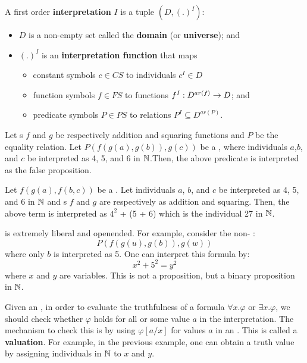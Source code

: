 \documentclass[english, 11pt]{article}
\begin{document}
  \begin{defn}[interpretation]\label{interpretation}
  A first order \textbf{interpretation} $I$ is a tuple $(D,(.)^I)$:
  \begin{itemize}
    \item $D$ is a non-empty set called the \textbf{domain} (or \textbf{universe}); and
    \item $(.)^I$ is an \textbf{interpretation function} that maps
    \begin{itemize}
      \item constant symbols $c \in CS$ to individuals $c^I \in D$
      \item function symbols $f \in FS$ to functions $f^I:D^{ar(f)} \rightarrow D$; and
      \item predicate symbols $P \in PS$ to relations $P^I \subseteq D^{ar(P)}$.
    \end{itemize}
  \end{itemize}
  \end{defn}
  \begin{exmp}
    Let s $f$ and $g$ be respectively addition and squaring functions and $P$ be the equality relation. Let $P(f(g(a),g(b)),g(c))$ be a  , where individuals $a$,$b$, and $c$ be interpreted as 4, 5, and 6 in ${\mathbb{N}}$.Then, the above predicate is interpreted as the false proposition.
  \end{exmp}
  \begin{exmp}
    Let $f(g(a),f(b,c))$ be a . Let individuals $a$, $b$, and $c$ be interpreted as 4, 5, and 6 in ${\mathbb{N}}$ and s $f$ and $g$ are respectively as addition and squaring. Then, the above term is interpreted as $4^2$ + (5 + 6) which is the individual 27 in ${\mathbb{N}}$.
  \end{exmp}
  \begin{exmp}
     is extremely liberal and openended. For example, consider the non- :
    \[ P(f(g(u),g(b)),g(w)) \]
    where only $b$ is interpreted as 5. One can interpret this formula by:
    \[ x^2+ 5^2=y^2 \]
    where $x$ and $y$ are  variables. This is not a proposition, but a binary proposition  in ${\mathbb{N}}$.
  \end{exmp}
  Given an , in order to evaluate the truthfulness of a formula $\forall x. \varphi$ or $\exists x . \varphi$, we should check whether $\varphi$ holds for all or some value $a$ in the interpretation. The mechanism to check this is by using  $\varphi[a/x]$ for values $a$ in an . This is called a \textbf{valuation}. For example, in the previous example, one can obtain a truth value by assigning individuals in ${\mathbb{N}}$ to $x$ and $y$.
\end{document}
